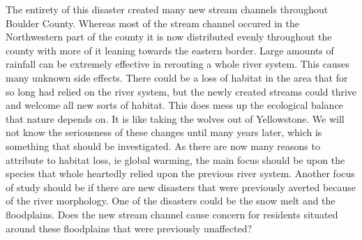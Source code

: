 \documentclass[twoside]{article}
\begin{document}
\begin{multicols}{2}
The entirety of this disaster created many new stream channels throughout Boulder County. Whereas most of the stream channel occured in the Northwestern part of the county it is now distributed evenly throughout the county with more of it leaning towards the eastern border. Large amounts of rainfall can be extremely effective in rerouting a whole river system. This causes many unknown side effects. There could be a loss of habitat in the area that for so long had relied on the river system, but the newly created streams could thrive and welcome all new sorts of habitat. This does mess up the ecological balance that nature depends on. It is like taking the wolves out of Yellowstone. We will not know the seriousness of these changes until many years later, which is something that should be investigated. As there are now many reasons to attribute to habitat loss, ie global warming, the main focus should be upon the species that whole heartedly relied upon the previous river system. Another focus of study should be if there are new disasters that were previously averted because of the river morphology. One of the disasters could be the snow melt and the floodplains. Does the new stream channel cause concern for residents situated around these floodplains that were previously unaffected?



\end{multicols}
\end{document}
